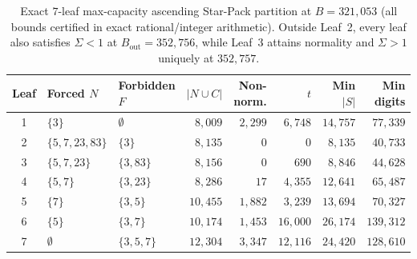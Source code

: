 \documentclass[11pt]{article}
\theoremstyle{remark}
\begin{document}
\begin{table}[t]
\centering
\caption{Exact $7$-leaf max-capacity ascending Star-Pack partition at $B = 321{,}053$
(all bounds certified in exact rational/integer arithmetic). Outside Leaf~2, every
leaf also satisfies $\Sigma < 1$ at $B_{\mathrm{out}} = 352{,}756$, while Leaf~3
attains normality and $\Sigma > 1$ uniquely at $352{,}757$.}
\label{tab:leaves}
\small
\begin{tabular}{cllrrrrr}
\toprule
Leaf & Forced $N$ & Forbidden $F$ & $|N\cup C|$ & Non-norm. & $t$ & Min $|S|$ & Min digits \\
\midrule
1 & $\{3\}$ & $\emptyset$ & $8{,}009$ & $2{,}299$ & $6{,}748$ & $14{,}757$ & $77{,}339$ \\
2 & $\{5,7,23,83\}$ & $\{3\}$ & $8{,}135$ & $0$ & $0$ & $8{,}135$ & $40{,}733$ \\
3 & $\{5,7,23\}$ & $\{3,83\}$ & $8{,}156$ & $0$ & $690$ & $8{,}846$ & $44{,}628$ \\
4 & $\{5,7\}$ & $\{3,23\}$ & $8{,}286$ & $17$ & $4{,}355$ & $12{,}641$ & $65{,}487$ \\
5 & $\{7\}$ & $\{3,5\}$ & $10{,}455$ & $1{,}882$ & $3{,}239$ & $13{,}694$ & $70{,}327$ \\
6 & $\{5\}$ & $\{3,7\}$ & $10{,}174$ & $1{,}453$ & $16{,}000$ & $26{,}174$ & $139{,}312$ \\
7 & $\emptyset$ & $\{3,5,7\}$ & $12{,}304$ & $3{,}347$ & $12{,}116$ & $24{,}420$ & $128{,}610$ \\
\bottomrule
\end{tabular}
\end{table}
\end{document}
